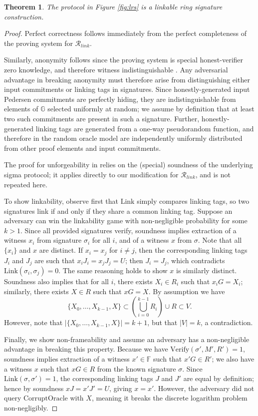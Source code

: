\documentclass{article}
\newcommand{\G}{\mathbb{G}}
\newcommand{\F}{\mathbb{F}}
\newtheorem{theorem}{Theorem}
\theoremstyle{definition}
\begin{document}
\begin{theorem}
The protocol in Figure \ref{fig:lrs} is a linkable ring signature construction.
\end{theorem}

\begin{proof}
Perfect correctness follows immediately from the perfect completeness of the proving system for $\mathcal{R}_{link}$.

Similarly, anonymity follows since the proving system is special honest-verifier zero knowledge, and therefore witness indistinguishable \cite{cramer}.
Any adversarial advantage in breaking anonymity must therefore arise from distinguishing either input commitments or linking tags in signatures.
Since honestly-generated input Pedersen commitments are perfectly hiding, they are indistinguishable from elements of $\G$ selected uniformly at random; we assume by definition that at least two such commitments are present in such a signature.
Further, honestly-generated linking tags are generated from a one-way pseudorandom function, and therefore in the random oracle model are independently uniformly distributed from other proof elements and input commitments.

The proof for unforgeability in \cite{groth} relies on the (special) soundness of the underlying sigma protocol; it applies directly to our modification for $\mathcal{R}_{link}$, and is not repeated here.

To show linkability, observe first that $\text{Link}$ simply compares linking tags, so two signatures link if and only if they share a common linking tag.
Suppose an adversary can win the linkability game with non-negligible probability for some $k > 1$.
Since all provided signatures verify, soundness implies extraction of a witness $x_i$ from signature $\sigma_i$ for all $i$, and of a witness $x$ from $\sigma$.
Note that all $\{x_i\}$ and $x$ are distinct.
If $x_i = x_j$ for $i \neq j$, then the corresponding linking tags $J_i$ and $J_j$ are such that $x_iJ_i = x_jJ_j = U$; then $J_i = J_j$, which contradicts $\text{Link}(\sigma_i,\sigma_j) = 0$.
The same reasoning holds to show $x$ is similarly distinct.
Soundness also implies that for all $i$, there exists $X_i \in R_i$ such that $x_iG = X_i$; similarly, there exists $X \in R$ such that $xG = X$.
By assumption we have $$\{X_0,\ldots,X_{k-1},X\} \subset \left( \bigcup_{i=0}^{k-1} R_i \right) \cup R \subset V.$$
However, note that $\left| \{X_0,\ldots,X_{k-1},X\} \right| = k+1$, but that $\left| V \right| = k$, a contradiction.

Finally, we show non-frameability and assume an adversary has a non-negligible advantage in breaking this property.
Because we have $\text{Verify}(\sigma',M',R') = 1$, soundness implies extraction of a witness $x' \in \F$ such that $x'G \in R'$; we also have a witness $x$ such that $xG \in R$ from the known signature $\sigma$.
Since $\text{Link}(\sigma,\sigma') = 1$, the corresponding linking tags $J$ and $J'$ are equal by definition; hence by soundness $xJ = x'J' = U$, giving $x = x'$.
However, the adversary did not query $\text{CorruptOracle}$ with $X$, meaning it breaks the discrete logarithm problem non-negligibly.
\end{proof}
\end{document}
